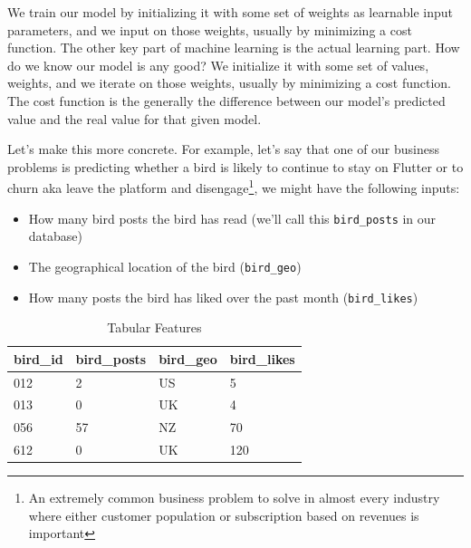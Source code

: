 \documentclass[11pt]{diazessay} %
\begin{document}
We train our model by initializing it with some set of weights as learnable input parameters, and we input on those weights, usually by minimizing a cost function. The other key part of machine learning is the actual learning part. How do we know our model is any good? We initialize it with some set of values, weights, and we iterate on those weights, usually by minimizing a cost function. The cost function is the generally the difference between our model's predicted value and the real value for that given model.

Let's make this more concrete. For example, let's say that one of our business problems is predicting whether a bird is likely to continue to stay on Flutter or to churn aka leave the platform and disengage\footnote{An extremely common business problem to solve in almost every industry where either customer population or subscription based on revenues is important}, we might have the following inputs: 

\begin{itemize}
  \item How many bird posts the bird has read (we'll call this \texttt{bird_posts} in our database)
  \item The geographical location of the bird (\texttt{bird_geo})
  \item How many posts the bird has liked over the past month (\texttt{bird_likes})
\end{itemize}

\begin{table}[H]
  \centering
    \caption{Tabular Features}
\begin{tabular}{|l|l|l|l|}
\hline
\rowcolor[HTML]{EFEFEF} 
bird\_id & bird\_posts & bird\_geo & bird\_likes \\ \hline
012      & 2           & US        & 5           \\ \hline
013      & 0           & UK        & 4           \\ \hline
056      & 57          & NZ        & 70          \\ \hline
612      & 0           & UK        & 120         \\ \hline
\end{tabular}
\end{table}
\end{document}
